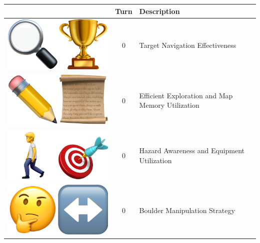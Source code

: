 

\begin{table}[ht]
\centering
\begin{tabular}{|c|c|l|}
\hline
\textbf{} & \textbf{Turn} & \textbf{Description} \\
\hline
\rowcolor{gray!10} \includegraphics[scale=0.07]{figs/emojis/emoji_1.png} & 0 & Target Navigation Effectiveness \\
\hline
\rowcolor{gray!10} \includegraphics[scale=0.07]{figs/emojis/emoji_2.png} & 0 & Efficient Exploration and Map Memory Utilization \\
\hline
\rowcolor{gray!10} \includegraphics[scale=0.07]{figs/emojis/emoji_3.png} & 0 & Hazard Awareness and Equipment Utilization \\
\hline
\rowcolor{gray!10} \includegraphics[scale=0.07]{figs/emojis/emoji_4.png} & 0 & Boulder Manipulation Strategy \\

\end{tabular}
\end{table}
